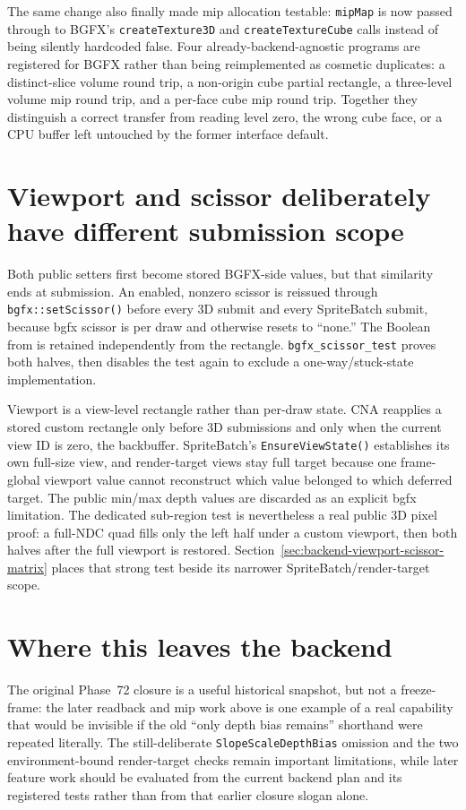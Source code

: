 The same change also finally made mip allocation testable: \texttt{mipMap} is now passed through
to BGFX's \texttt{createTexture3D} and \texttt{createTextureCube} calls instead of being silently
hardcoded false. Four already-backend-agnostic programs are registered for BGFX rather than being
reimplemented as cosmetic duplicates: a distinct-slice volume round trip, a non-origin cube
partial rectangle, a three-level volume mip round trip, and a per-face cube mip round trip.
Together they distinguish a correct transfer from reading level zero, the wrong cube face, or a
CPU buffer left untouched by the former interface default.

\section{Viewport and scissor deliberately have different submission scope}

Both public setters first become stored BGFX-side values, but that similarity ends at
submission. An enabled, nonzero scissor is reissued through \texttt{bgfx::setScissor()} before
every 3D submit and every SpriteBatch submit, because bgfx scissor is per draw and otherwise
resets to ``none.'' The Boolean from  is retained independently from
the rectangle. \texttt{bgfx\_scissor\_test} proves both halves, then disables the test again to
exclude a one-way/stuck-state implementation.

Viewport is a view-level rectangle rather than per-draw state. CNA reapplies a stored custom
rectangle only before 3D submissions and only when the current view ID is zero, the backbuffer.
SpriteBatch's \texttt{EnsureViewState()} establishes its own full-size view, and render-target
views stay full target because one frame-global viewport value cannot reconstruct which value
belonged to which deferred target. The public min/max depth values are discarded as an explicit
bgfx limitation. The dedicated sub-region test is nevertheless a real public 3D pixel proof:
a full-NDC quad fills only the left half under a custom viewport, then both halves after the
full viewport is restored. Section~\ref{sec:backend-viewport-scissor-matrix} places that strong
test beside its narrower SpriteBatch/render-target scope.

\section{Where this leaves the backend}

The original Phase~72 closure is a useful historical snapshot, but not a freeze-frame: the
later readback and mip work above is one example of a real capability that would be invisible if
the old ``only depth bias remains'' shorthand were repeated literally. The still-deliberate
\texttt{SlopeScaleDepthBias} omission and the two environment-bound render-target checks remain
important limitations, while later feature work should be evaluated from the current backend
plan and its registered tests rather than from that earlier closure slogan alone.
